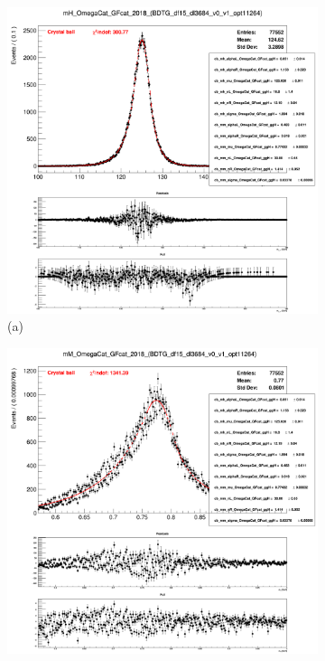 \begin{figure}[!ht]
    \captionsetup[subfigure]{labelformat=empty}
    \vspace*{-0.2cm}
    \centering
    \setlength{\mylength}{\textwidth}
    \begin{subfigure}[t]{0.50\mylength}
        \centering
        \includegraphics[width=0.45\mylength]{resources/plots/Omega_fit_SGN_MH.png}
        \caption{\footnotesize (a)}
    \end{subfigure}%
    \begin{subfigure}[t]{0.50\mylength}
        \centering
        \includegraphics[width=0.45\mylength]{resources/plots/Omega_fit_SGN_MM.png}

\end{subfigure}
\end{figure}
